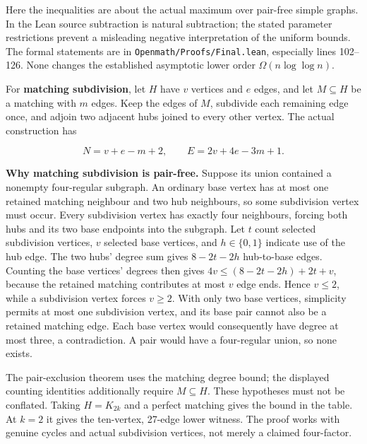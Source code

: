 \documentclass[smallextended]{svjour3}
\newcounter{none} %
\begin{document}
Here the inequalities are about the actual maximum over pair-free simple
graphs. In the Lean source subtraction is natural subtraction; the
stated parameter restrictions prevent a misleading negative
interpretation of the uniform bounds. The formal statements are in
{\ttfamily\nolinkurl{Openmath/Proofs/Final.lean}}, especially lines 102--126. None
changes the established asymptotic lower order \(\Omega(n\log\log n)\).

For \textbf{matching subdivision}, let \(H\) have \(v\) vertices and
\(e\) edges, and let \(M\subseteq H\) be a matching with \(m\) edges.
Keep the edges of \(M\), subdivide each remaining edge once, and adjoin
two adjacent hubs joined to every other vertex. The actual construction
has

\[N=v+e-m+2,\qquad E=2v+4e-3m+1.\]

\textbf{Why matching subdivision is pair-free.} Suppose its union
contained a nonempty four-regular subgraph. An ordinary base vertex has
at most one retained matching neighbour and two hub neighbours, so some
subdivision vertex must occur. Every subdivision vertex has exactly four
neighbours, forcing both hubs and its two base endpoints into the
subgraph. Let \(t\) count selected subdivision vertices, \(v\) selected
base vertices, and \(h\in\{0,1\}\) indicate use of the hub edge. The two
hubs' degree sum gives \(8-2t-2h\) hub-to-base edges. Counting the base
vertices' degrees then gives \(4v\le(8-2t-2h)+2t+v\), because the
retained matching contributes at most \(v\) edge ends. Hence \(v\le2\),
while a subdivision vertex forces \(v\ge2\). With only two base
vertices, simplicity permits at most one subdivision vertex, and its
base pair cannot also be a retained matching edge. Each base vertex
would consequently have degree at most three, a contradiction. A pair
would have a four-regular union, so none exists.

The pair-exclusion theorem uses the matching degree bound; the displayed
counting identities additionally require \(M\subseteq H\). These
hypotheses must not be conflated. Taking \(H=K_{2k}\) and a perfect
matching gives the bound in the table. At \(k=2\) it gives the
ten-vertex, 27-edge lower witness. The proof works with genuine cycles
and actual subdivision vertices, not merely a claimed four-factor.
\end{document}
